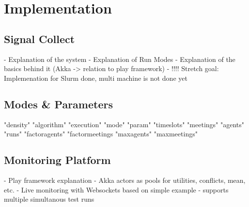 \chapter{Implementation}

\section{Signal Collect}

- Explanation of the system
- Explanation of Run Modes
- Explanation of the basics behind it (Akka -> relation to play framework)
- !!!! Stretch goal: Implemenation for Slurm done, multi machine is not done yet

\section{Modes \& Parameters}

"density"
"algorithm"
"execution"
"mode"
"param"
"timeslots"
"meetings"
"agents"
"runs"
"factoragents"
"factormeetings
"maxagents"
"maxmeetings"


\section{Monitoring Platform}

- Play framework explanation
- Akka actors as pools for utilities, conflicts, mean, etc.
- Live monitoring with Websockets based on simple example
- supports multiple simultanous test runs